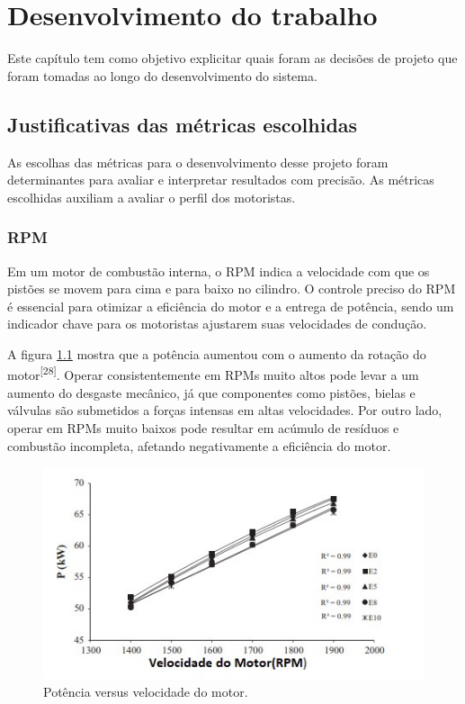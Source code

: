 \chapter{Desenvolvimento do trabalho}


Este capítulo tem como objetivo explicitar quais foram as decisões de projeto que foram tomadas ao longo do desenvolvimento do sistema.

\section{Justificativas das métricas escolhidas}

As escolhas das métricas para o desenvolvimento desse projeto foram determinantes para avaliar e interpretar resultados com precisão. As métricas escolhidas auxiliam a avaliar o perfil dos motoristas.

\subsection{RPM}

 Em um motor de combustão interna, o RPM indica a velocidade com que os pistões se movem para cima e para baixo no cilindro. O controle preciso do RPM é essencial para otimizar a eficiência do motor e a entrega de potência, sendo um indicador chave para os motoristas ajustarem suas velocidades de condução.

 A figura \ref{fig:rpmxpotencia} mostra que a potência aumentou com o aumento da rotação do motor\textsuperscript{[28]}. Operar consistentemente em RPMs muito altos pode levar a um aumento do desgaste mecânico, já que componentes como pistões, bielas e válvulas são submetidos a forças intensas em altas velocidades. Por outro lado, operar em RPMs muito baixos pode resultar em acúmulo de resíduos e combustão incompleta, afetando negativamente a eficiência do motor.

 \begin{figure}[hp]
    \centering
    
    \includegraphics[scale= 1]{figures/rpmxpotencia.jpeg}
    
    \caption{Potência versus velocidade do motor.}
    
    \label{fig:rpmxpotencia}
\end{figure}

